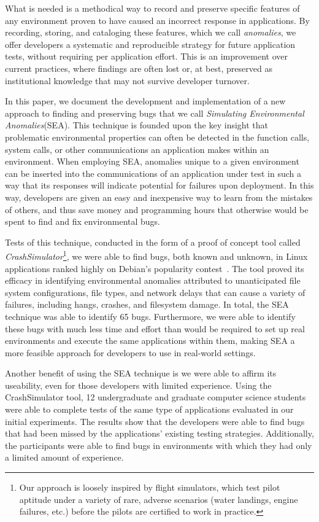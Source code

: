 What is needed is a methodical way to record and preserve specific features of any environment proven to have caused an incorrect response in applications. By recording,
storing, and cataloging these features, which we call \textit{anomalies}, we offer developers a
systematic and reproducible strategy for future application tests, without requiring per application effort. This is an improvement over current practices, where findings are often lost or, at best, preserved as institutional knowledge that may not survive developer turnover.

In  this paper, we document the development and implementation of a new
approach to finding and preserving bugs that we call \textit{Simulating
Environmental Anomalies}(SEA). This technique is founded upon the key
insight that problematic environmental properties can often be detected
in the function calls, system
calls, or other communications an application makes within an
environment. When employing SEA, anomalies unique to a given environment
can be inserted into the communications of
an application under test in such a way that its responses will indicate
potential for failures upon deployment. In this way, developers are given
an easy and inexpensive way to learn from the mistakes of others, and
thus save money and programming hours that otherwise would be spent to
find and fix environmental bugs.

Tests of this technique, conducted in the form of a proof of concept tool
called {\em CrashSimulator}\footnote{Our approach is
loosely inspired by flight simulators, which test pilot aptitude under a
variety of rare, adverse scenarios (water landings, engine failures,
etc.) before the pilots are certified to work in practice.}, we were
able to find bugs, both known and unknown, in Linux applications ranked
highly on Debian’s popularity contest~\cite{DebPopCon}. The tool proved
its efficacy in identifying environmental anomalies attributed to
unanticipated file system configurations, file types, and network delays
that can cause a variety of failures, including hangs, crashes, and
filesystem damage.  In total, the SEA technique was able to identify 65
bugs.  Furthermore, we were able to identify these bugs with much less
time and effort than would be required to set up real environments and
execute the same applications within them, making SEA a more feasible
approach for developers to use in real-world settings.

Another benefit of using the SEA technique is we were able to affirm its
useability, even for those developers with limited experience. Using the
CrashSimulator tool, 12 undergraduate and graduate computer science
students were able to complete tests of the same type of applications
evaluated in our initial experiments. The results show that the
developers were able to find bugs that had been missed by the
applications’ existing testing strategies. Additionally, the participants
were able to find bugs in environments with which they had only a limited
amount of experience.

